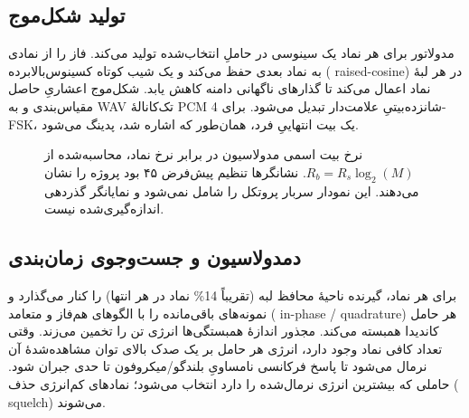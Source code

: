 \documentclass[12pt,a4paper]{article}
\providecommand{\lr}[1]{\foreignlanguage{english}{\begingroup\hyphenchar\font=-1 #1\endgroup}}
\begin{document}
\subsection{تولید شکل‌موج}
مدولاتور برای هر نماد یک سینوسی در حاملِ انتخاب‌شده تولید می‌کند. فاز را از نمادی به نماد بعدی حفظ می‌کند و یک شیب کوتاه کسینوس‌بالابرده (\lr{raised-cosine}) در هر لبۀ نماد اعمال می‌کند تا گذارهای ناگهانی دامنه کاهش یابد. شکل‌موج اعشاریِ حاصل مقیاس‌بندی و به \lr{WAV} تک‌کانالۀ \lr{PCM} شانزده‌بیتیِ علامت‌دار تبدیل می‌شود. برای \lr{4-FSK}، یک بیت انتهاییِ فرد، همان‌طور که اشاره شد، پدینگ می‌شود.

\begin{figure}[ht]
\centering
\begin{otherlanguage}{english}
\end{otherlanguage}
\caption{نرخ بیت اسمی مدولاسیون در برابر نرخ نماد، محاسبه‌شده از $R_b=R_s\log_2(M)$. نشانگرها تنظیم پیش‌فرض ۴۵ بود پروژه را نشان می‌دهند. این نمودار سربار پروتکل را شامل نمی‌شود و نمایانگر گذردهی اندازه‌گیری‌شده نیست.}
\label{fig:rate}
\end{figure}

\subsection{دمدولاسیون و جست‌وجوی زمان‌بندی}
برای هر نماد، گیرنده ناحیۀ محافظ لبه (تقریباً \lr{14\%} نماد در هر انتها) را کنار می‌گذارد و نمونه‌های باقی‌مانده را با الگوهای هم‌فاز و متعامد (\lr{in-phase / quadrature}) هر حامل کاندیدا همبسته می‌کند. مجذور اندازۀ همبستگی‌ها انرژی تن را تخمین می‌زند. وقتی تعداد کافی نماد وجود دارد، انرژی هر حامل بر یک صدک بالای توان مشاهده‌شدۀ آن نرمال می‌شود تا پاسخ فرکانسی نامساویِ بلندگو/میکروفون تا حدی جبران شود. حاملی که بیشترین انرژی نرمال‌شده را دارد انتخاب می‌شود؛ نمادهای کم‌انرژی حذف (\lr{squelch}) می‌شوند.
\end{document}
